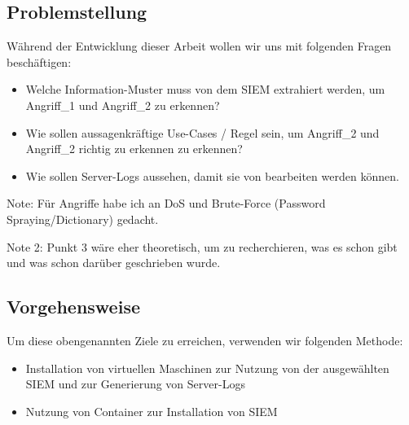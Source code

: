 \subsection{Problemstellung}
Während der Entwicklung dieser Arbeit wollen wir uns mit folgenden Fragen beschäftigen:

\begin{itemize}
   \item Welche Information-Muster muss von dem \gls{SIEM} extrahiert werden, um Angriff\_1 und Angriff\_2 zu erkennen?
   \item Wie sollen aussagenkräftige Use-Cases / Regel sein, um Angriff\_2 und Angriff\_2 richtig zu erkennen zu erkennen?
   \item Wie sollen Server-Logs aussehen, damit sie von  bearbeiten werden können.
\end{itemize}

Note: Für Angriffe habe ich an DoS und Brute-Force (Password Spraying/Dictionary) gedacht.

Note 2: Punkt 3 wäre eher theoretisch, um zu recherchieren, was es schon gibt und was schon darüber geschrieben wurde.

\subsection{Vorgehensweise}
Um diese obengenannten Ziele zu erreichen, verwenden wir folgenden Methode:

\begin{itemize}[noitemsep]
   \item Installation von virtuellen Maschinen zur Nutzung von der ausgewählten \gls{SIEM} und zur Generierung von Server-Logs
   \item Nutzung von Container zur Installation von \gls{SIEM}
\end{itemize}

